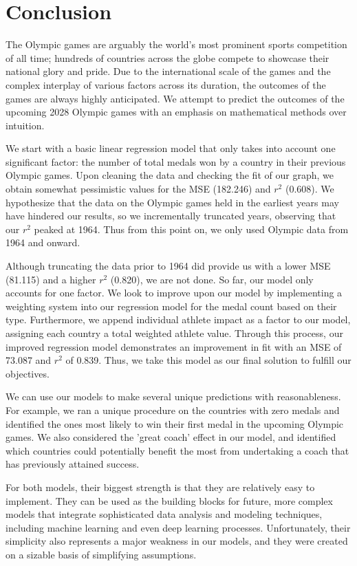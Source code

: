 \documentclass{mcmthesis}
\begin{document}
\section{Conclusion}
The Olympic games are arguably the world's most prominent sports competition of all time; hundreds of countries across the globe compete to showcase their national glory and pride. Due to the international scale of the games and the complex interplay of various factors across its duration, the outcomes of the games are always highly anticipated. We attempt to predict the outcomes of the upcoming 2028 Olympic games with an emphasis on mathematical methods over intuition. \par We start with a basic linear regression model that only takes into account one significant factor: the number of total medals won by a country in their previous Olympic games. Upon cleaning the data and checking the fit of our graph, we obtain somewhat pessimistic values for the MSE (182.246) and $r^2$ (0.608). We hypothesize that the data on the Olympic games held in the earliest years may have hindered our results, so we incrementally truncated years, observing that our $r^2$ peaked at 1964. Thus from this point on, we only used Olympic data from 1964 and onward. \par
Although truncating the data prior to 1964 did provide us with a lower MSE (81.115) and a higher $r^2$ (0.820), we are not done. So far, our model only accounts for one factor. We look to improve upon our model by implementing a weighting system into our regression model for the medal count based on their type. Furthermore, we append individual athlete impact as a factor to our model, assigning each country a total weighted athlete value. Through this process, our improved regression model demonstrates an improvement in fit with an MSE of 73.087 and $r^2$ of 0.839. Thus, we take this model as our final solution to fulfill our objectives. \par
We can use our models to make several unique predictions with reasonableness. For example, we ran a unique procedure on the countries with zero medals and identified the ones most likely to win their first medal in the upcoming Olympic games. We also considered the 'great coach' effect in our model, and identified which countries could potentially benefit the most from undertaking a coach that has previously attained success. \par
For both models, their biggest strength is that they are relatively easy to implement. They can be used as the building blocks for future, more complex models that integrate sophisticated data analysis and modeling techniques, including machine learning and even deep learning processes. Unfortunately, their simplicity also represents a major weakness in our models, and they were created on a sizable basis of simplifying assumptions. \par
\end{document}
